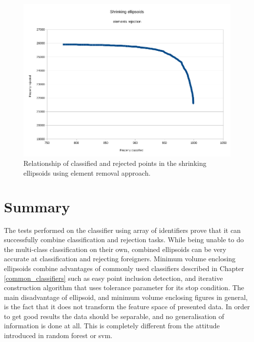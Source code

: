 \begin{figure}[htp]
	\centering
	\includegraphics[width=1.\textwidth]{Figures/shrinking_ellipsoid_elements_rejection2.png}
	\caption{ Relationship of classified and rejected points in the shrinking ellipsoids using element removal approach. }
	\label{fig:shrinking_ellipsoids_elements_rejection2}\vspace{-3pt}
\end{figure}

\section{Summary}

The tests performed on the classifier using array of identifiers prove that it can successfully combine classification and rejection tasks. While being unable to do the multi-class classification on their own, combined ellipsoids can be very accurate at classification and rejecting foreigners. Minimum volume enclosing ellipsoids combine advantages of commonly used classifiers described in Chapter \ref{common_classifiers} such as easy point inclusion detection, and iterative construction algorithm that uses tolerance parameter for its stop condition. The main disadvantage of ellipsoid, and minimum volume enclosing figures in general, is the fact that it does not transform the feature space of presented data. In order to get good results the data should be separable, and no generalisation of information is done at all. This is completely different from the attitude introduced in random forest or svm.
